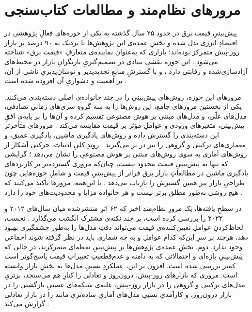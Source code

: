 
\section{مرورهای نظام‌مند و مطالعات کتاب‌سنجی}

پیش‌بینیِ قیمت برق در حدود ۲۵ سال گذشته به یکی از حوزه‌های فعالِ پژوهشی در
اقتصادِ انرژی بدل شده و بخشِ عمده‌ی این پژوهش‌ها  تا نزدیک به ۹۰ درصد
 بر بازار روز-پیش متمرکز بوده‌اند؛ بازاری که به‌عنوان نماینده‌ی متعارفِ
«قیمت برق» شناخته می‌شود \cite{jedrzejewski_electricity_2022}. این حوزه نقشی
بنیادی در تصمیم‌گیریِ بازیگرانِ بازار در محیط‌های آزادسازی‌شده و رقابتی دارد
\cite{jiang_review_2018, cerjan_literature_2013, oconnor_review_2025}، و با
گسترشِ منابعِ تجدیدپذیر و نوسان‌پذیریِ ناشی از آن، بر اهمیت و دشواریِ آن افزوده
شده است \cite{oconnor_review_2025, cerjan_literature_2013}.

مرورهای این حوزه، روش‌های پیش‌بینی را در چند خانواده‌ی اصلی دسته‌بندی می‌کنند.
یکی از نخستین مرورهای جامع، این روش‌ها را به سه گروهِ سری‌های زمانیِ تصادفی،
مدل‌های علّی، و مدل‌های مبتنی بر هوش مصنوعی تقسیم کرده و آن‌ها را بر پایه‌ی افقِ
پیش‌بینی، متغیرهای ورودی و عواملِ مؤثر بر قیمت مقایسه می‌کند
\cite{aggarwal_electricity_2009}. مرورهای متأخرتر این دسته‌بندی را گسترش داده و
روش‌های یادگیری ماشین، یادگیری عمیق، و معماری‌های ترکیبی و گروهی را نیز در بر
می‌گیرند \cite{oconnor_review_2025}. روندِ کلیِ ادبیات، حرکتی آشکار از روش‌های
آماری به سوی روش‌های مبتنی بر هوش مصنوعی را نشان می‌دهد \cite{jiang_review_2018,
oconnor_review_2025}؛ گرایشی که تنها به پیش‌بینیِ قیمت محدود نیست، چنان‌که مروری
گسترده‌تر بر کاربردهای یادگیری ماشین در مطالعاتِ بازار برق  فراتر از
پیش‌بینیِ قیمت و شاملِ حوزه‌هایی چون طراحیِ بازار  نیز همین گسترش را بازتاب
می‌دهد \cite{mohammadi_review_2020}. با این‌همه، مرورها تأکید می‌کنند که هیچ روشی
به‌طور مطلق برتر نیست و هر خانواده مزایا و محدودیت‌های خود را دارد
\cite{jiang_review_2018}.

در سطحِ یافته‌ها، یک مرورِ نظام‌مندِ اخیر که ۶۲ اثرِ منتشرشده میان سال‌های
۲۰۱۲ و ۲۰۲۲ را بررسی کرده است، بر چند نکته‌ی مشترک انگشت می‌گذارد
\cite{chai_forecasting_2024}. نخست، لحاظ‌کردنِ عواملِ تعیین‌کننده‌ی قیمت می‌تواند
دقتِ مدل‌ها را به‌طور چشمگیری بهبود دهد، هرچند بر سرِ این‌که کدام عوامل و به چه
شماری باید در نظر گرفته شوند اجماعی وجود ندارد. دوم، بخشِ عمده‌ی پژوهش‌ها بر
پیش‌بینیِ نقطه‌ای متمرکزند، در حالی که پیش‌بینیِ بازه‌ای و احتمالاتی  که به
دامنه و عدم‌قطعیتِ تغییراتِ قیمت پاسخ‌گوتر است  کمتر بررسی شده است. افزون
بر این، عملکردِ نسبیِ مدل‌ها به بخشِ بازار وابسته است: مروری که بازارهای روز-پیش،
درون‌روز و تعادلی را کنارِ هم می‌سنجد، برتریِ مدل‌های ترکیبی و گروهی را در بازار
روز-پیش، غلبه‌ی شبکه‌های عصبیِ بازگشتی را در بازار درون‌روز، و کارآمدیِ نسبیِ
مدل‌های آماریِ ساده‌تری مانند  را در بازار تعادلی گزارش می‌کند
\cite{oconnor_review_2025}.

